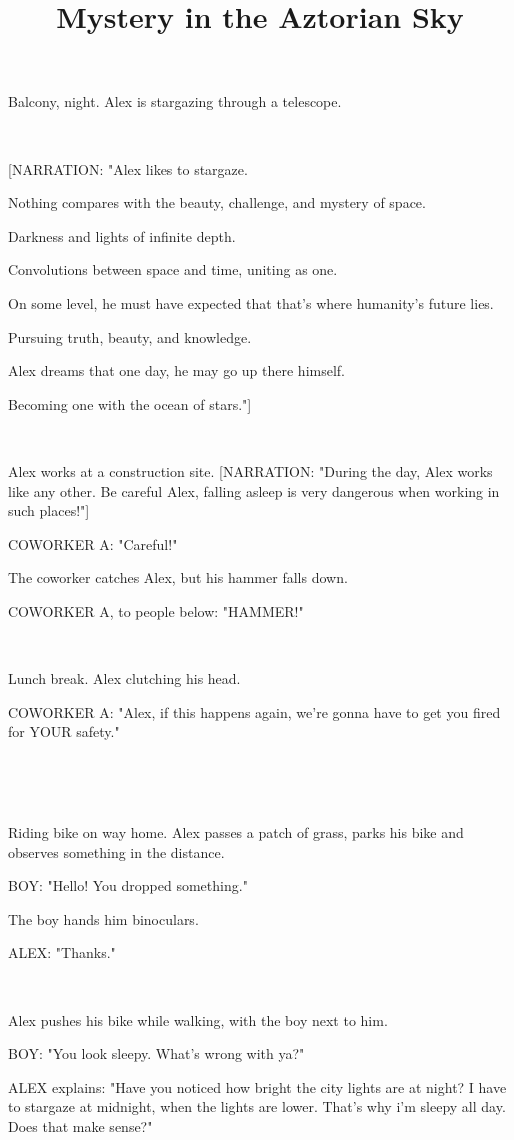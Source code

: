 \documentclass[11pt]{article}
\begin{document}
\ttfamily
\title{Mystery in the Aztorian Sky}
\maketitle

Balcony, night.
Alex is stargazing through a telescope.

\ 

[NARRATION: "Alex likes to stargaze.

Nothing compares with the beauty, challenge, and mystery of space.

Darkness and lights of infinite depth.

Convolutions between space and time, uniting as one.

On some level, he must have expected that that's where humanity's future lies.

Pursuing truth, beauty, and knowledge.

Alex dreams that one day, he may go up there himself.

Becoming one with the ocean of stars."]

\ 

Alex works at a construction site.
[NARRATION: "During the day, Alex works like any other.
Be careful Alex, falling asleep is very dangerous when working in such places!"]

COWORKER A: "Careful!"

The coworker catches Alex, but his hammer falls down.

COWORKER A, to people below: "HAMMER!"

\ 

Lunch break. 
Alex clutching his head.

COWORKER A: "Alex, if this happens again, we're gonna have to get you fired for YOUR safety."

\ 

\ 

Riding bike on way home.
Alex passes a patch of grass, parks his bike and observes something in the distance. 

BOY: "Hello!
You dropped something."

The boy hands him binoculars.

ALEX: "Thanks."

\ 

Alex pushes his bike while walking, with the boy next to him. 

BOY: "You look sleepy. 
What's wrong with ya?"

ALEX explains: "Have you noticed how bright the city lights are at night?
I have to stargaze at midnight, when the lights are lower.
That's why i'm sleepy all day.
Does that make sense?"
\end{document}
